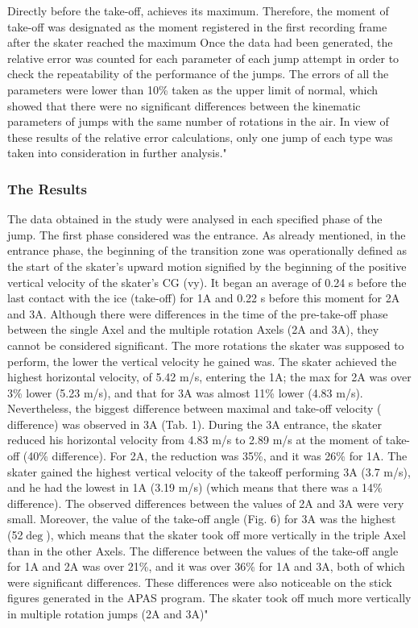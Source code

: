\documentclass[12pt,journal,compsoc]{IEEEtran}
\begin{document}
Directly before the take-off, %
achieves its maximum.
Therefore, the moment of take-off was designated as the moment registered in the first recording frame after the skater
reached the maximum 
Once the data had been generated,
the relative error was counted for each parameter of each jump
attempt in order to check the repeatability of the performance
of the jumps. The errors of all the parameters were lower than
10\% taken as the upper limit of normal, which showed that
there were no significant differences between the kinematic parameters of jumps with the same number of rotations in the air.
In view of these results of the relative error calculations, only
one jump of each type was taken into consideration in further
analysis."
\subsubsection{The Results}
The data obtained in the study were analysed in each specified phase of the jump. The first phase considered was the entrance.
As already mentioned, in the entrance phase, the beginning
of the transition zone was operationally defined as the start of
the skater’s upward motion signified by the beginning of the
positive vertical velocity of the skater’s CG (vy). It began an average of 0.24 s before the last contact with the ice (take-off) for 1A
and 0.22 s before this moment for 2A and 3A. Although there
were differences in the time of the pre-take-off phase between
the single Axel and the multiple rotation Axels (2A and 3A),
they cannot be considered significant.
The more rotations the skater was supposed to perform, the
lower the vertical velocity he gained was. The skater achieved
the highest horizontal velocity, of 5.42 m/s, entering the 1A; the
 max for 2A was over 3\% lower (5.23 m/s), and that for 3A was
almost 11\% lower (4.83 m/s). Nevertheless, the biggest difference between maximal and take-off velocity (%
difference) was
observed in 3A (Tab. 1). During the 3A entrance, the skater reduced his horizontal velocity from 4.83 m/s to 2.89 m/s at the moment of take-off (40\% difference). For 2A, the reduction was
35\%, and it was 26\% for 1A.
The skater gained the highest vertical velocity of the takeoff performing 3A (3.7 m/s), and he had the lowest %
in 1A
(3.19 m/s) (which means that there was a 14\% difference). The
observed differences between the %
values of 2A and 3A were
very small. Moreover, the value of the take-off angle (Fig. 6) for
3A was the highest (52$\deg$), which means that the skater took off
more vertically in the triple Axel than in the other Axels. The
difference between the values of the take-off angle for 1A and 2A
was over 21\%, and it was over 36\% for 1A and 3A, both of which
were significant differences. These differences were also noticeable on the stick figures generated in the APAS program. The
skater took off much more vertically in multiple rotation jumps
(2A and 3A)" \cite{Axel}
\end{document}
